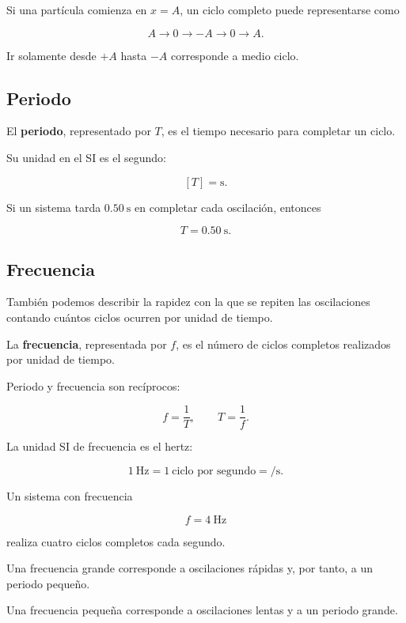 Si una partícula comienza en \(x=A\), un ciclo completo puede representarse como

\[ A\longrightarrow 0\longrightarrow -A\longrightarrow 0\longrightarrow A. \]

Ir solamente desde \(+A\) hasta \(-A\) corresponde a medio ciclo.

\subsection{Periodo}

\begin{definicion}[Periodo]
El \textbf{periodo}, representado por \(T\), es el tiempo necesario para completar un ciclo.

Su unidad en el SI es el segundo:

\[ [T]=\si{\second}. \]
\end{definicion}

Si un sistema tarda \(\SI{0.50}{\second}\) en completar cada oscilación, entonces

\[ T=\SI{0.50}{\second}. \]

\subsection{Frecuencia}

También podemos describir la rapidez con la que se repiten las oscilaciones contando cuántos ciclos ocurren por unidad de tiempo.

\begin{definicion}[Frecuencia]
La \textbf{frecuencia}, representada por \(f\), es el número de ciclos completos realizados por unidad de tiempo.
\end{definicion}

Periodo y frecuencia son recíprocos:

\[ \boxed{f=\frac{1}{T}},\qquad \boxed{T=\frac{1}{f}}. \]

La unidad SI de frecuencia es el hertz:

\[ \SI{1}{\hertz}=1\ \text{ciclo por segundo}=\si{\per\second}. \]

Un sistema con frecuencia

\[ f=\SI{4}{\hertz} \]

realiza cuatro ciclos completos cada segundo.

\begin{interpretacion}
Una frecuencia grande corresponde a oscilaciones rápidas y, por tanto, a un periodo pequeño.

Una frecuencia pequeña corresponde a oscilaciones lentas y a un periodo grande.
\end{interpretacion}

